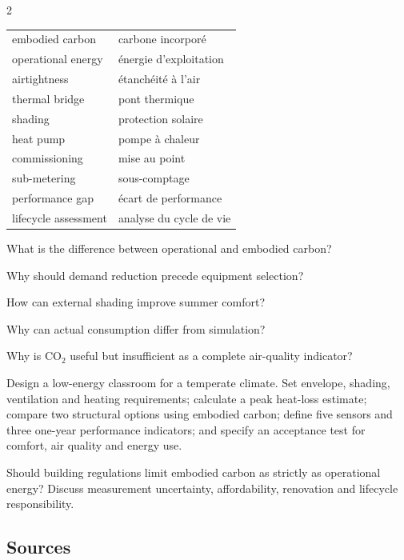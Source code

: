 \begin{multicols}{2}
\begin{vocabulary}
\begin{tabularx}{\linewidth}{@{}lX@{}}
embodied carbon & carbone incorporé\\
operational energy & énergie d’exploitation\\
airtightness & étanchéité à l’air\\
thermal bridge & pont thermique\\
shading & protection solaire\\
heat pump & pompe à chaleur\\
commissioning & mise au point\\
sub-metering & sous-comptage\\
performance gap & écart de performance\\
lifecycle assessment & analyse du cycle de vie
\end{tabularx}
\end{vocabulary}

\begin{questions}
\item What is the difference between operational and embodied carbon?
\item Why should demand reduction precede equipment selection?
\item How can external shading improve summer comfort?
\item Why can actual consumption differ from simulation?
\item Why is CO$_2$ useful but insufficient as a complete air-quality indicator?
\end{questions}

\begin{engineeringchallenge}
Design a low-energy classroom for a temperate climate. Set envelope, shading, ventilation and heating requirements;
calculate a peak heat-loss estimate; compare two structural options using embodied carbon; define five sensors and
three one-year performance indicators; and specify an acceptance test for comfort, air quality and energy use.
\end{engineeringchallenge}

\begin{speaking}
Should building regulations limit embodied carbon as strictly as operational energy? Discuss measurement uncertainty,
affordability, renovation and lifecycle responsibility.
\end{speaking}
\end{multicols}

\subsection*{Sources}
